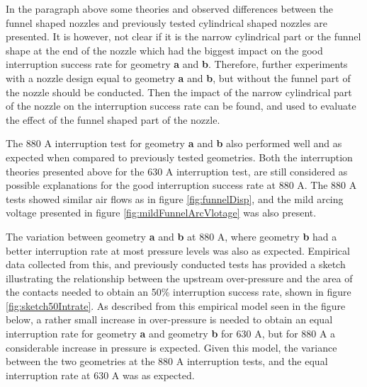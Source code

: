 \documentclass[10pt,b5paper,twoside]{article}
\begin{document}
In the paragraph above some theories and observed differences between the funnel shaped nozzles and previously tested cylindrical shaped nozzles are presented. It is however, not clear if it is the narrow cylindrical part or the funnel shape at the end of the nozzle which had the biggest impact on the good interruption success rate for geometry \textbf{a} and \textbf{b}. Therefore, further experiments with a nozzle design equal to geometry \textbf{a} and \textbf{b}, but without the funnel part of the nozzle should be conducted. Then the impact of the narrow cylindrical part of the nozzle on the interruption success rate can be found, and used to evaluate the effect of the funnel shaped part of the nozzle. 

The 880 A interruption test for geometry \textbf{a} and \textbf{b} also performed well and as expected when compared to previously tested geometries. Both the interruption theories presented above for the 630 A interruption test, are still considered as possible explanations for the good interruption success rate at 880 A. The 880 A tests showed similar air flows as in figure \ref{fig:funnelDisp}, and the mild arcing voltage presented in figure \ref{fig:mildFunnelArcVlotage} was also present.

The variation between geometry \textbf{a} and \textbf{b} at 880 A, where geometry \textbf{b} had a better interruption rate at most pressure levels was also as expected. Empirical data collected from this, and previously conducted tests has provided a sketch illustrating the relationship between the upstream over-pressure and the area of the contacts needed to obtain an 50\% interruption success rate, shown in figure \ref{fig:sketch50Intrate}. As described from this empirical model seen in the figure below, a rather small increase in over-pressure is needed to obtain an equal interruption rate for geometry \textbf{a} and geometry \textbf{b} for 630 A, but for 880 A a considerable increase in pressure is expected. Given this model, the variance between the two geometries at the 880 A interruption tests, and the equal interruption rate at 630 A was as expected.
\end{document}
